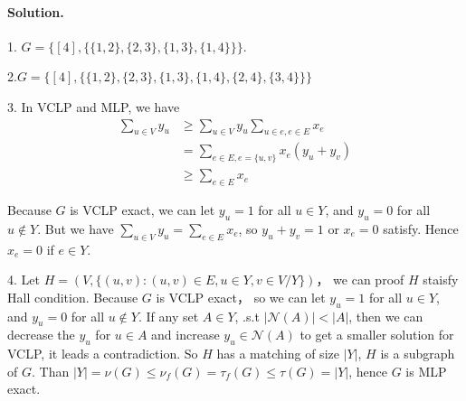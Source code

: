 \documentclass[12pt,a4]{article}
\begin{document}
\paragraph{Solution.}

1. $G = \{ [4], \{\{1,2\}, \{2,3\}, \{1,3\},\{1,4\}\}\}$.

2.$G = \{ [4], \{\{1,2\}, \{2,3\}, \{1,3\},\{1,4\}, \{2,4\}, \{3,4\}\}\}$

3. In VCLP and MLP, we have
\begin{align*}
    \sum_{u\in V} y_u
    &\geq \sum_{u\in V} y_u \sum_{u \in e, e \in E} x_e \\
    &= \sum_{e \in E, e = \{u, v\}} x_e (y_u + y_v) \\
    &\geq \sum_{e \in E} x_e
\end{align*}

Because $G$ is VCLP exact, we can let $y_u = 1$ for all $u \in Y$, and $y_u = 0$ for all $u \not\in Y$. 
But we have $ \sum_{u\in V} y_u = \sum_{e \in E} x_e$, so $y_u + y_v = 1$ or $x_e = 0$ satisfy. Hence $x_e = 0$
if $e \in Y$.

4. Let $H = (V, \{(u, v) : (u, v) \in E, u \in Y, v \in V / Y\})$， we can proof $H$ staisfy Hall condition. Because $G$ is VCLP exact， so we can let $y_u = 1$ for all $u \in Y$, and $y_u = 0$ for all $u \not\in Y$.
If any set $A \in Y$, .s.t 
$|\mathcal{N}(A)| < |A|$, then we can decrease the $y_u$ for $u \in A$ and increase $y_u \in \mathcal{N}(A)$ to get a smaller solution 
for VCLP, it leads a contradiction. So $H$ has a matching of size $|Y|$, $H$ is a subgraph of $G$. Than $|Y| = \nu(G) \leq \nu_f(G)=\tau_f(G)\leq\tau(G)=|Y|$, hence $G$ is 
MLP exact.
\end{document}
